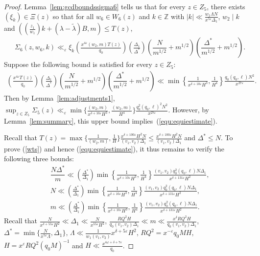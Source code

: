 \documentclass{amsart}
\numberwithin{equation}{section}
\begin{document}
\begin{proof} Lemma~\ref{lem:gcdboundssigma6} tells us that 
for every $z \in Z_5$, there exists $(\xi_k) \in \Xi(z)$ so that for all $w_6 \in W_6(z)$ and  $k \in \mathbb{Z}$ with   $|k| \ll  \frac{w_1\Lambda N}{x^{5\varepsilon}\Delta_1}$,   
 $w_2 \mid k$  and $((\frac{z_1}{w_1})k+(\lambda-\widetilde{\lambda})B,m) \leq T(z)$, 
\begin{align*}
 &\Sigma_6(z,w_6, k) \ll_\varepsilon \xi_k \left(\frac{x^{4\varepsilon} (w_2,m) T(z)}{q_0} \right)\left(\frac{\Delta_1}{\Delta^*}\right)\left(\dfrac{N}{m^{1/2}} + m^{1/2} \right)\!\left(\dfrac{\Delta^*}{ m^{1/2} }  + m^{1/2}\right).
\end{align*}
Suppose the following bound is satisfied for every $z \in Z_5$: 
\begin{align} \label{wts}
 \left(\frac{x^{4\varepsilon}  T(z)}{q_0} \right)\left(\frac{\Delta_1}{\Delta^*}\right)\left(\dfrac{N}{m^{1/2}} + m^{1/2} \right)\!\left(\dfrac{\Delta^*}{m^{1/2} }  + m^{1/2}\right) \ll  \min\left\{\frac{1}{x^{\delta+10\varepsilon}H^3},\frac{1}{H^4}\right\}\frac{q_0(q_0,\ell)  N^2}{ x^{27\varepsilon}} .
\end{align}
Then by Lemma~\ref{lem:adjustments1}, $\sup_{z \in Z_5}\Sigma_5(z) \ll_\varepsilon  \min\{\tfrac{(w_2,m)}{x^{\delta+10\varepsilon}H^3}, \tfrac{ (w_2,m)}{H^4}\}\tfrac{q_0^2(q_0,\ell)^2 N^2 }{x^{27\varepsilon}} $. However, by Lemma~\ref{lem:summary}, this upper bound  implies~(\ref{equ:equiestimate}). 

\vspace{3mm}
Recall that $T(z) = \max\{\tfrac{1}{(w_2,m)}, \tfrac{1}{H}\} \tfrac{x^{\delta+100\varepsilon}H^2 N}{(v_1,v_2)\Delta_1} \leq \tfrac{x^{\delta+100\varepsilon}H^2 N}{(v_1,v_2)\Delta_1} $ and $\Delta^* \leq N$.   To prove (\ref{wts}) and hence (\ref{equ:equiestimate}), it thus remains to verify the following three bounds:
\begin{align} \label{wts1}
&\dfrac{N\Delta^*}{ m}  \ll  \left(\frac{\Delta^*}{\Delta_1}\right)\min\left\{\frac{1}{x^{\delta+10\varepsilon}H^3},\frac{1}{H^4}\right\}\frac{(v_1,v_2)q_0^2(q_0,\ell)  N \Delta_1}{ x^{\delta+131\varepsilon}H^2}, \\ \label{wts2}
 &N \ll  \left(\frac{\Delta^*}{\Delta_1}\right)\min\left\{\frac{1}{x^{\delta+10\varepsilon}H^3},\frac{1}{H^4}\right\}\frac{(v_1,v_2)q_0^2(q_0,\ell)  N \Delta_1}{ x^{\delta+131\varepsilon}H^2 }, \\ \label{wts3}
&m \ll  \left(\frac{\Delta^*}{\Delta_1}\right)\min\left\{\frac{1}{x^{\delta+10\varepsilon}H^3},\frac{1}{H^4}\right\}\frac{(v_1,v_2)q_0^2(q_0,\ell)  N \Delta_1}{ x^{\delta+131\varepsilon}H^2}.
\end{align}
Recall  that $\tfrac{N}{x^{\delta+55\varepsilon}H^2}\ll \Delta_1 \ll \tfrac{N}{x^{55\varepsilon}H^2}$, $\tfrac{RQ^2H}{q_0 (v_1,v_2)\Delta_1} \ll m \ll \tfrac{x^{\delta}RQ^2H}{q_0 (v_1,v_2)\Delta_1}$,  $\Delta^* = \min\{\frac{N}{x^{5\varepsilon}\Lambda }, \Delta_1\}$, $\Lambda \ll \frac{1}{w_1(v_1,v_2)}x^{\delta+5\varepsilon}H^2 $,  $ RQ^2=x^{-\varepsilon} q_0 M H  $, $H = x^\varepsilon RQ^2 (q_0 M)^{-1}$ and $H \ll \tfrac{x^{4\omega+\delta+7\varepsilon}}{q_0}$.


\end{proof}
\end{document}
